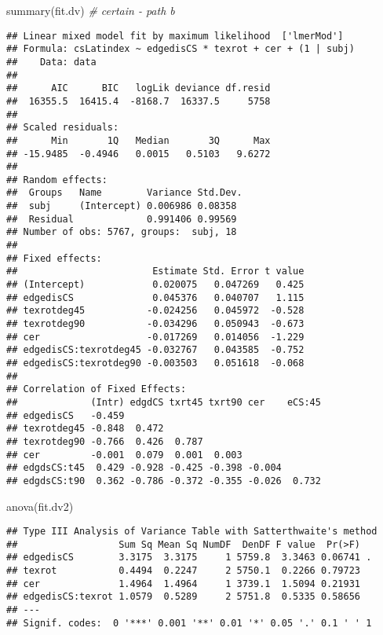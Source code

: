 \documentclass[
]{article}
\newenvironment{Shaded}{\begin{snugshade}}{\end{snugshade}}
\newcommand{\CommentTok}[1]{\textcolor[rgb]{0.56,0.35,0.01}{\textit{#1}}}
\newcommand{\FunctionTok}[1]{\textcolor[rgb]{0.00,0.00,0.00}{#1}}
\newcommand{\NormalTok}[1]{#1}
\begin{document}
\begin{Shaded}
\begin{Highlighting}[]
\FunctionTok{summary}\NormalTok{(fit.dv) }\CommentTok{\# certain {-} path b}
\end{Highlighting}
\end{Shaded}

\begin{verbatim}
## Linear mixed model fit by maximum likelihood  ['lmerMod']
## Formula: csLatindex ~ edgedisCS * texrot + cer + (1 | subj)
##    Data: data
## 
##      AIC      BIC   logLik deviance df.resid 
##  16355.5  16415.4  -8168.7  16337.5     5758 
## 
## Scaled residuals: 
##      Min       1Q   Median       3Q      Max 
## -15.9485  -0.4946   0.0015   0.5103   9.6272 
## 
## Random effects:
##  Groups   Name        Variance Std.Dev.
##  subj     (Intercept) 0.006986 0.08358 
##  Residual             0.991406 0.99569 
## Number of obs: 5767, groups:  subj, 18
## 
## Fixed effects:
##                        Estimate Std. Error t value
## (Intercept)            0.020075   0.047269   0.425
## edgedisCS              0.045376   0.040707   1.115
## texrotdeg45           -0.024256   0.045972  -0.528
## texrotdeg90           -0.034296   0.050943  -0.673
## cer                   -0.017269   0.014056  -1.229
## edgedisCS:texrotdeg45 -0.032767   0.043585  -0.752
## edgedisCS:texrotdeg90 -0.003503   0.051618  -0.068
## 
## Correlation of Fixed Effects:
##             (Intr) edgdCS txrt45 txrt90 cer    eCS:45
## edgedisCS   -0.459                                   
## texrotdeg45 -0.848  0.472                            
## texrotdeg90 -0.766  0.426  0.787                     
## cer         -0.001  0.079  0.001  0.003              
## edgdsCS:t45  0.429 -0.928 -0.425 -0.398 -0.004       
## edgdsCS:t90  0.362 -0.786 -0.372 -0.355 -0.026  0.732
\end{verbatim}

\begin{Shaded}
\begin{Highlighting}[]
\FunctionTok{anova}\NormalTok{(fit.dv2)}
\end{Highlighting}
\end{Shaded}

\begin{verbatim}
## Type III Analysis of Variance Table with Satterthwaite's method
##                  Sum Sq Mean Sq NumDF  DenDF F value  Pr(>F)  
## edgedisCS        3.3175  3.3175     1 5759.8  3.3463 0.06741 .
## texrot           0.4494  0.2247     2 5750.1  0.2266 0.79723  
## cer              1.4964  1.4964     1 3739.1  1.5094 0.21931  
## edgedisCS:texrot 1.0579  0.5289     2 5751.8  0.5335 0.58656  
## ---
## Signif. codes:  0 '***' 0.001 '**' 0.01 '*' 0.05 '.' 0.1 ' ' 1
\end{verbatim}
\end{document}
